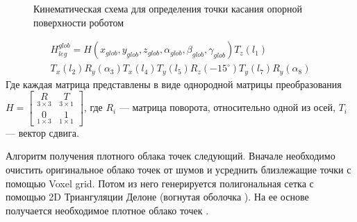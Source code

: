 \begin{figure}[H]
    \caption{Кинематическая схема для определения точки касания опорной поверхности роботом}
    \label{fig:StriRus_10_legs_15_angle_v4.png}
\end{figure}

\begin{multline}
    \label{eq:forw_kin}
        H_{leg}^{glob} = H(x_{glob},y_{glob},z_{glob},\alpha_{glob},\beta_{glob},\gamma_{glob})T_z(l_1)\\ T_x(l_2)R_y(\alpha_3)T_x(l_4)T_y(l_5)R_z(-15^{\circ})T_y(l_7)R_y(\alpha_8)
\end{multline}
Где каждая матрица представлены в виде однородной матрицы преобразования $H = \begin{bmatrix}
        \underset{3 \times 3}{R} & \underset{3 \times 1}{T} \\
        \underset{1 \times 3}{0} & \underset{1 \times 1}{1}
    \end{bmatrix}$, где $R_i$ --- матрица поворота, относительно одной из осей, $T_i$ --- вектор сдвига.

Алгоритм получения плотного облака точек следующий. Вначале необходимо очистить оригинальное облако точек от шумов и усреднить близлежащие точки с помощью Voxel grid. Потом из него генерируется полигональная сетка с помощью 2D Триангуляции Делоне  (вогнутая оболочка ). На ее основе получается необходимое плотное облако точек . 

